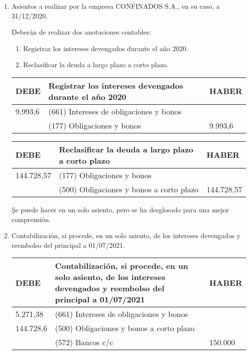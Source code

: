\begin{enumerate}[label=\alph*)]
\item Asientos a realizar por la empresa CONFINADOS S.A., en su caso, a 31/12/2020.

Deberán de realizar dos anotaciones contables:
\begin{enumerate}
    \item Registrar los intereses devengados durante el año 2020.
    \item Reclasificar la deuda a largo plazo a corto plazo.
\end{enumerate}

\begin{table}[H]
\centering
\begin{tabular}{|p{2cm}|p{8cm}|p{2cm}|}
\hline
\rowcolor{blue!30}
\textbf{DEBE} & \textbf{Registrar los intereses devengados durante el año 2020} & \textbf{HABER} \\ \hline
9.993,6 & (661) Intereses de obligaciones y bonos & \\ \hline
& (177) Obligaciones y bonos & 9.993,6 \\ \hline
\end{tabular}
\end{table}

\begin{table}[H]
\centering
\begin{tabular}{|p{2cm}|p{8cm}|p{2cm}|}
\hline
\rowcolor{blue!30}
\textbf{DEBE} & \textbf{Reclasificar la deuda a largo plazo a corto plazo} & \textbf{HABER} \\ \hline
144.728,57 & (177) Obligaciones y bonos & \\ \hline
& (500) Obligaciones y bonos a corto plazo & 144.728,57 \\ \hline
\end{tabular}
\end{table}

\c{Se puede hacer en un solo asiento, pero se ha desglosado para una mejor comprensión.}

\item Contabilización, si procede, en un solo asiento, de los intereses devengados y reembolso del principal a 01/07/2021.

\begin{table}[H]
\centering
\begin{tabular}{|p{2cm}|p{8cm}|p{2cm}|}
\hline
\rowcolor{blue!30}
\textbf{DEBE} & \textbf{Contabilización, si procede, en un solo asiento, de los intereses devengados y reembolso del principal a 01/07/2021} & \textbf{HABER} \\ \hline
5.271,38 & (661) Intereses de obligaciones y bonos & \\ \hline
144.728,6 & (500) Obligaciones y bonos a corto plazo & \\ \hline
& (572) Bancos c/c & 150.000 \\ \hline
\end{tabular}
\end{table}

\end{enumerate}


